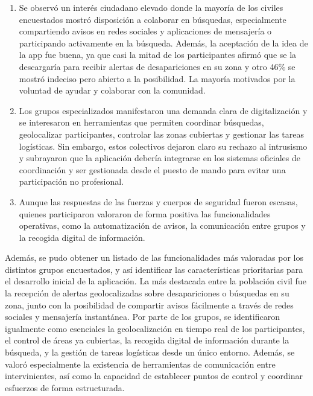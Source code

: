     \begin{enumerate}
        \item Se observó un interés ciudadano elevado donde la mayoría de los civiles encuestados mostró disposición a colaborar en búsquedas, especialmente compartiendo avisos en redes sociales y aplicaciones de mensajería o participando activamente en la búsqueda. Además, la aceptación de la idea de la app fue buena, ya que casi la mitad de los participantes afirmó que se la descargaría para recibir alertas de desapariciones en su zona y otro 46\% se mostró indeciso pero abierto a la posibilidad. La mayoría motivados por la voluntad de ayudar y colaborar con la comunidad.

        \item Los grupos especializados manifestaron una demanda clara de digitalización y se interesaron en herramientas que permiten coordinar búsquedas, geolocalizar participantes, controlar las zonas cubiertas y gestionar las tareas logísticas. Sin embargo, estos colectivos dejaron claro su rechazo al intrusismo y subrayaron que la aplicación debería integrarse en los sistemas oficiales de coordinación y ser gestionada desde el puesto de mando para evitar una participación no profesional.

        \item Aunque las respuestas de las fuerzas y cuerpos de seguridad fueron escasas, quienes participaron valoraron de forma positiva las funcionalidades operativas, como la automatización de avisos, la comunicación entre grupos y la recogida digital de información.
    \end{enumerate}

    Además, se pudo obtener un listado de las funcionalidades más valoradas por los distintos grupos encuestados, y así identificar las características prioritarias para el desarrollo inicial de la aplicación. La más destacada entre la población civil fue la recepción de alertas geolocalizadas sobre desapariciones o búsquedas en su zona, junto con la posibilidad de compartir avisos fácilmente a través de redes sociales y mensajería instantánea. Por parte de los grupos, se identificaron igualmente como esenciales la geolocalización en tiempo real de los participantes, el control de áreas ya cubiertas, la recogida digital de información durante la búsqueda, y la gestión de tareas logísticas desde un único entorno. Además, se valoró especialmente la existencia de herramientas de comunicación entre intervinientes, así como la capacidad de establecer puntos de control y coordinar esfuerzos de forma estructurada.
    


